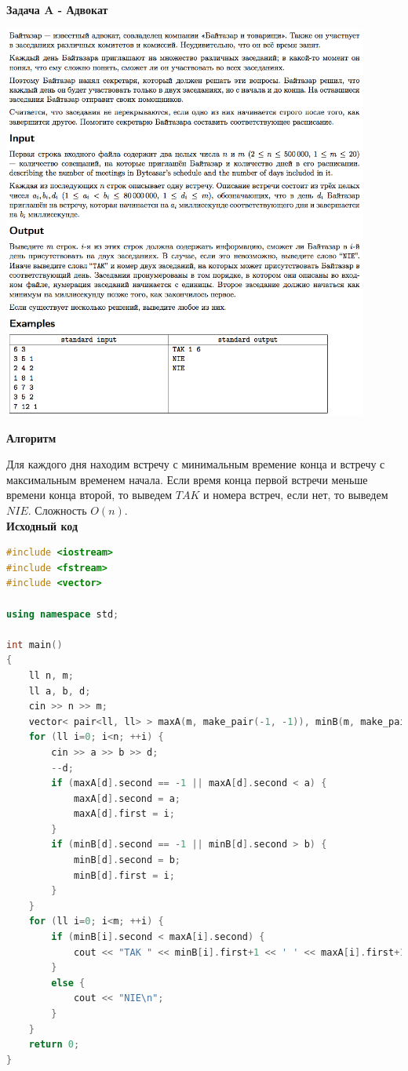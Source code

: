 \documentclass[a4paper,12pt]{article}
\begin{document}
\newpage
\textbf{{\large Задача A - Адвокат}}

\begin{center}
\includegraphics[width=0.9\textwidth]{OC_Central_Europe/OC_Central_Europe_A.png}\\ [1cm]
\end{center}

\newpage
\textbf{{\large Алгоритм}}

Для каждого дня находим встречу с минимальным времение конца и встречу с максимальным временем начала. Если время конца первой встречи меньше времени конца второй, то выведем $TAK$ и номера встреч, если нет, то выведем $NIE$. Сложность $O(n)$. \\

\textbf{{\large Исходный код}} \\
\begin{lstlisting}[language=C++]
#include <iostream>
#include <fstream>
#include <vector>

using namespace std;

int main()
{
    ll n, m;
    ll a, b, d;
    cin >> n >> m;
    vector< pair<ll, ll> > maxA(m, make_pair(-1, -1)), minB(m, make_pair(-1, -1));
    for (ll i=0; i<n; ++i) {
        cin >> a >> b >> d;
        --d;
        if (maxA[d].second == -1 || maxA[d].second < a) {
            maxA[d].second = a;
            maxA[d].first = i;
        }
        if (minB[d].second == -1 || minB[d].second > b) {
            minB[d].second = b;
            minB[d].first = i;
        }
    }
    for (ll i=0; i<m; ++i) {
        if (minB[i].second < maxA[i].second) {
            cout << "TAK " << minB[i].first+1 << ' ' << maxA[i].first+1 << '\n';
        }
        else {
            cout << "NIE\n";
        }
    }
    return 0;
}

\end{lstlisting}
\end{document}
